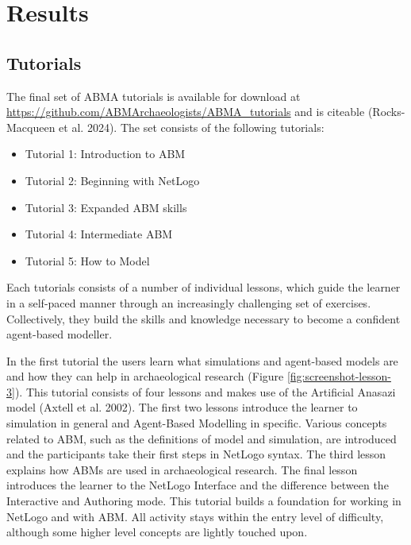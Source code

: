 \documentclass[
]{article}
\begin{document}
\hypertarget{results}{%
\section{Results}\label{results}}

\hypertarget{tutorials}{%
\subsection{Tutorials}\label{tutorials}}

The final set of ABMA tutorials is available for download at \url{https://github.com/ABMArchaeologists/ABMA_tutorials} and is citeable (Rocks-Macqueen et al. 2024). The set consists of the following tutorials:

\begin{itemize}
\item
  Tutorial 1: Introduction to ABM
\item
  Tutorial 2: Beginning with NetLogo
\item
  Tutorial 3: Expanded ABM skills
\item
  Tutorial 4: Intermediate ABM
\item
  Tutorial 5: How to Model
\end{itemize}

Each tutorials consists of a number of individual lessons, which guide the learner in a self-paced manner through an increasingly challenging set of exercises. Collectively, they build the skills and knowledge necessary to become a confident agent-based modeller.

In the first tutorial the users learn what simulations and agent-based models are and how they can help in archaeological research (Figure \ref{fig:screenshot-lesson-3}). This tutorial consists of four lessons and makes use of the Artificial Anasazi model (Axtell et al. 2002). The first two lessons introduce the learner to simulation in general and Agent-Based Modelling in specific. Various concepts related to ABM, such as the definitions of model and simulation, are introduced and the participants take their first steps in NetLogo syntax. The third lesson explains how ABMs are used in archaeological research. The final lesson introduces the learner to the NetLogo Interface and the difference between the Interactive and Authoring mode. This tutorial builds a foundation for working in NetLogo and with ABM. All activity stays within the entry level of difficulty, although some higher level concepts are lightly touched upon.
\end{document}
